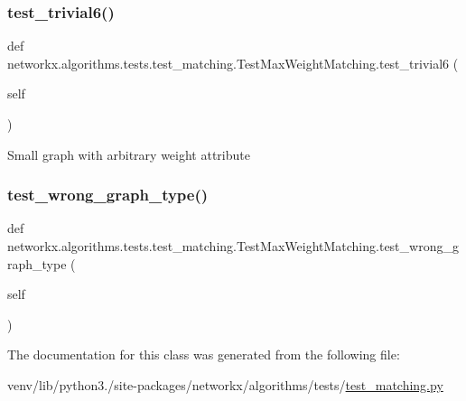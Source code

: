\subsubsection{\texorpdfstring{test\+\_\+trivial6()}{test\_trivial6()}}
{\footnotesize\ttfamily def networkx.\+algorithms.\+tests.\+test\+\_\+matching.\+Test\+Max\+Weight\+Matching.\+test\+\_\+trivial6 (\begin{DoxyParamCaption}\item[{}]{self }\end{DoxyParamCaption})}

\begin{DoxyVerb}Small graph with arbitrary weight attribute\end{DoxyVerb}
 \mbox{\label{classnetworkx_1_1algorithms_1_1tests_1_1test__matching_1_1TestMaxWeightMatching_a1cad973fd21343081f421a09058d70e4}} 
\subsubsection{\texorpdfstring{test\+\_\+wrong\+\_\+graph\+\_\+type()}{test\_wrong\_graph\_type()}}
{\footnotesize\ttfamily def networkx.\+algorithms.\+tests.\+test\+\_\+matching.\+Test\+Max\+Weight\+Matching.\+test\+\_\+wrong\+\_\+graph\+\_\+type (\begin{DoxyParamCaption}\item[{}]{self }\end{DoxyParamCaption})}



The documentation for this class was generated from the following file\+:\begin{DoxyCompactItemize}
\item 
venv/lib/python3./site-\/packages/networkx/algorithms/tests/\hyperlink{tests_2test__matching_8py}{test\+\_\+matching.\+py}\end{DoxyCompactItemize}
